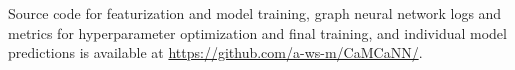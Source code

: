 \documentclass[journal=jctcce,manuscript=article]{achemso}
\begin{document}
\begin{suppinfo}

    Source code for featurization and model training, graph neural network logs
    and metrics for hyperparameter optimization and final training, and
    individual model predictions is available at
    \url{https://github.com/a-ws-m/CaMCaNN/}.

\end{suppinfo}


\end{document}
